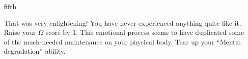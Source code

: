 \documentclass[notebook]{guildcamp1}
\begin{document}
\begin{page}{fifth}

That was very enlightening! You have never experienced anything quite like it. Raise your $\Omega$ score by 1. This emotional process seems to have duplicated some of the much-needed maintenance on your physical body. Tear up your ``Mental degradation'' ability.

\end{page}

\endnotebook
\end{document}
